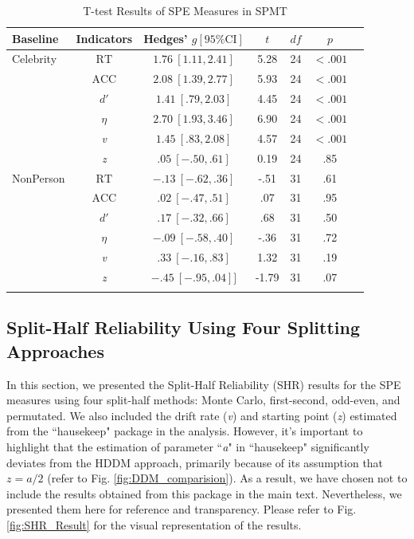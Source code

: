 \documentclass[sn-apa]{sn-jnl}%
\theoremstyle{thmstyleone}%
\theoremstyle{thmstyletwo}%
\theoremstyle{thmstylethree}%
\begin{document}
\begin{table}[!ht]
	\caption{T-test Results of SPE Measures in SPMT}\label{table:t-testresult}
	\label{table:Meta}%
	\begin{tabular}{@{}lcccccc@{}}
		\toprule
		Baseline & Indicators & Hedges’ $g[95\% \text{CI}]$& $t$ & $df$ & $p$\\
		\midrule
		Celebrity &  $\text{RT}$& $1.76\ [1.11, 2.41]$& 5.28& 24 & $<.001$\\
		&  $\text{ACC}$ & $2.08\ [1.39, 2.77]$& 5.93&24&$<.001$ \\
		&  $d'$ &$1.41\ [.79, 2.03] $&4.45&24&$<.001$ \\
		&  $\eta$ & $2.70\ [1.93, 3.46]$&6.90&24&$<.001$ \\
		&  \textit{v} &$1.45\ [.83, 2.08]$ &4.57&24&$<.001$ \\
		&  \textit{z} & $.05\ [-.50, .61]$&0.19&24&.85 \\
		
		NonPerson &  $\text{RT}$ &$-.13\ [-.62, .36]$ &-.51&31&.61 \\
		&  $\text{ACC}$ &$.02\ [-.47, .51]$ &.07&31&.95\\
		&  $d'$ & $.17\ [-.32, .66]$ &.68&31&.50\\
		&  $\eta$ & $-.09\ [-.58, .40]$&-.36&31&.72 \\
		&  \textit{v} & $.33\ [-.16, .83]$&1.32&31&.19\\
		&  \textit{z} & $-.45\ [-.95, .04]]$&-1.79&31&.07 \\
		\botrule
	\end{tabular}
\end{table}

\subsection{Split-Half Reliability Using Four Splitting Approaches}\label{sec:SHR}

In this section, we presented the Split-Half Reliability (SHR) results for the SPE measures using four split-half methods: Monte Carlo, first-second, odd-even, and permutated. We also included  the drift rate (\textit{v}) and starting point (\textit{z}) estimated from the ``hausekeep" package in the analysis. However, it's important to highlight that the estimation of parameter ``\textit{a}" in ``hausekeep" significantly deviates from the HDDM approach, primarily because of its assumption that $z = a / 2$ (refer to Fig. \ref{fig:DDM_comparision}). As a result, we have chosen not to include the results obtained from this package in the main text. Nevertheless, we presented them here for reference and transparency. Please refer to Fig. \ref{fig:SHR_Result} for the visual representation of the results.
\clearpage
\end{document}
